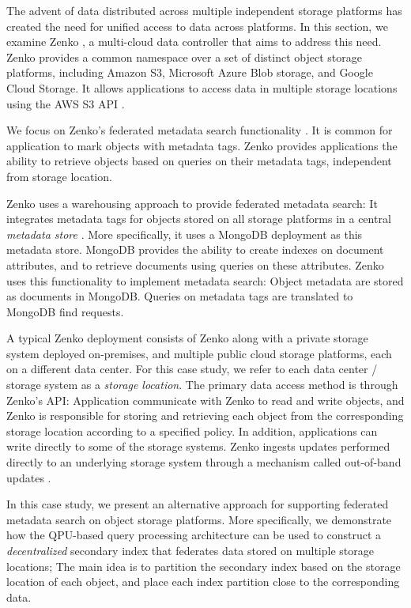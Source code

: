The advent of data distributed across multiple independent storage platforms has created the need for unified access to data across platforms.
In this section, we examine Zenko \cite{zenko:docs}, a multi-cloud data controller that aims to address this need.
Zenko provides a common namespace over a set of distinct object storage platforms,
including Amazon S3, Microsoft Azure Blob storage, and Google Cloud Storage.
It allows applications to access data in multiple storage locations using the AWS S3 API \cite{aws:s3}.

We focus on Zenko's federated metadata search functionality \cite{zenko:mdsearch}.
It is common for application to mark objects with metadata tags.
Zenko provides applications the ability to retrieve objects based on queries on their metadata tags,
independent from storage location.

Zenko uses a warehousing approach to provide federated metadata search:
It integrates metadata tags for objects stored on all storage platforms in a central \textit{metadata store} \cite{zenko:architecture, zenko:mongodb}.
More specifically, it uses a MongoDB deployment as this metadata store.
MongoDB provides the ability to create indexes on document attributes,
and to retrieve documents using queries on these attributes.
Zenko uses this functionality to implement metadata search:
Object metadata are stored as documents in MongoDB.
Queries on metadata tags are translated to MongoDB find requests.

A typical Zenko deployment consists of Zenko along with a private storage system deployed on-premises,
and multiple public cloud storage platforms, each on a different data center.
For this case study, we refer to each data center / storage system as a \textit{storage location}.
The primary data access method is through Zenko's API:
Application communicate with Zenko to read and write objects,
and Zenko is responsible for storing and retrieving each object from the corresponding storage location according to a specified policy.
In addition,
applications can write directly to some of the storage systems.
Zenko ingests updates performed directly to an underlying storage system through a mechanism called out-of-band updates \cite{zenko:outofband}.

\medskip
\noindent
In this case study,
we present an alternative approach for supporting federated metadata search on object storage platforms.
More specifically, we demonstrate how the QPU-based query processing architecture can be used to construct
a \textit{decentralized} secondary index that federates data stored on multiple storage locations;
The main idea is to partition the secondary index based on the storage location of each object,
and place each index partition close to the corresponding data.

